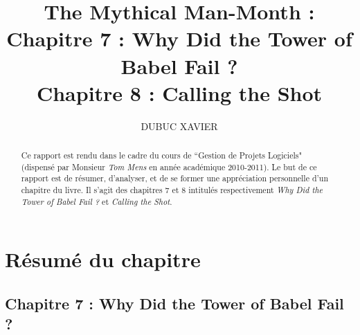 \documentclass[runningheads]{llncs}
\begin{document}
\frontmatter          %
\pagestyle{headings}  %
\mainmatter              %
\title{The Mythical Man-Month : \\
Chapitre 7 : Why Did the Tower of Babel Fail ? \\
Chapitre 8 : Calling the Shot\\}
%
%
\author{DUBUC XAVIER}
%


\maketitle              %

\begin{abstract}
Ce rapport est rendu dans le cadre du cours de ``Gestion de Projets Logiciels" (dispens\'e par Monsieur \emph{Tom Mens} en ann\'ee acad\'emique 2010-2011). Le but de ce rapport est de r\'esumer, d'analyser, et de se former une appr\'eciation personnelle d'un chapitre du livre\cite{Brooks1995}. Il s'agit des chapitres 7 et 8 intitul\'es respectivement \textit{Why Did the Tower of Babel 
Fail ?} et \textit{Calling the Shot}.
\end{abstract}


\newpage
\section{R\'esum\'e du chapitre}\label{sec:resume}

\subsection{Chapitre 7 : Why Did the Tower of Babel Fail ?}
\end{document}
